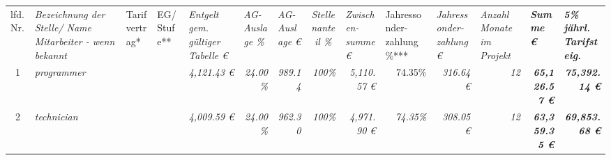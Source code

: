 \begin{table}[]
\begin{tabular}{cllllrrrrrrrrrr}
\multicolumn{1}{l}{lfd. Nr.}                                                            & \multicolumn{2}{l}{\cellcolor[HTML]{FFFF99}\textit{Bezeichnung der Stelle/ Name Mitarbeiter - wenn bekannt}} & \cellcolor[HTML]{FFFF99}Tarifvertrag* & \cellcolor[HTML]{FFFF99}EG/ Stufe**          & \multicolumn{1}{l}{\cellcolor[HTML]{FFFF99}\textit{Entgelt gem. gültiger Tabelle €}} & \multicolumn{1}{l}{\textit{AG-Auslage \%}}                & \multicolumn{1}{l}{\textit{AG-Auslage €}}                & \multicolumn{1}{c}{\cellcolor[HTML]{FFFF99}\textit{Stellenanteil \%}} & \multicolumn{1}{l}{\cellcolor[HTML]{92D050}\textit{Zwischen-summe €}} & \multicolumn{1}{l}{Jahressonder-zahlung \%***}                         & \multicolumn{1}{l}{\cellcolor[HTML]{92D050}\textit{Jahressonder-zahlung €}} & \multicolumn{1}{l}{\cellcolor[HTML]{FFFF99}\textit{Anzahl Monate im Projekt}} & \multicolumn{1}{l}{\cellcolor[HTML]{BFBFBF}\textit{\textbf{Summe €}}}    & \multicolumn{1}{l}{\textit{\textbf{5\% jährl. Tarifsteig.}}}                         \\
1                                                                                       & \multicolumn{2}{l}{\cellcolor[HTML]{FFFF99}\textit{programmer}}                                              & \cellcolor[HTML]{FFFF99}              & \cellcolor[HTML]{FFFF99}                     & \cellcolor[HTML]{FFFF99}\textit{4,121.43 €}                                          & \textit{24.00\%}                                          & \textit{989.14}                                          & \cellcolor[HTML]{FFFF99}\textit{100\%}                                & \cellcolor[HTML]{92D050}\textit{5,110.57 €}                           & \cellcolor[HTML]{FFFF99}74.35\%                                        & \cellcolor[HTML]{92D050}\textit{316.64 €}                                   & \cellcolor[HTML]{FFFF99}\textit{12}                                           & \cellcolor[HTML]{BFBFBF}\textit{\textbf{65,126.57 €}}                    & \textit{\textbf{75,392.14 €}}                                                        \\
2                                                                                       & \multicolumn{2}{l}{\cellcolor[HTML]{FFFF99}\textit{technician}}                                              & \cellcolor[HTML]{FFFF99}              & \cellcolor[HTML]{FFFF99}                     & \cellcolor[HTML]{FFFF99}\textit{4,009.59 €}                                          & \textit{24.00\%}                                          & \textit{962.30}                                          & \cellcolor[HTML]{FFFF99}\textit{100\%}                                & \cellcolor[HTML]{92D050}\textit{4,971.90 €}                           & \cellcolor[HTML]{FFFF99}\textit{74.35\%}                               & \cellcolor[HTML]{92D050}\textit{308.05 €}                                   & \cellcolor[HTML]{FFFF99}\textit{12}                                           & \cellcolor[HTML]{BFBFBF}\textit{\textbf{63,359.35 €}}                    & \textit{\textbf{69,853.68 €}}                                                        \\

\end{tabular}
\end{table}
